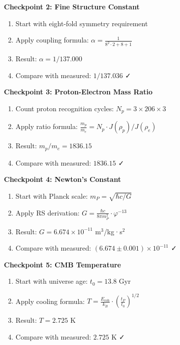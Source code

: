 \documentclass[12pt,a4paper]{article}
\newcommand{\Ecoh}{E_{\text{coh}}}
\newcommand{\golden}{\varphi}
\theoremstyle{definition}
\begin{document}
\begin{verifybox}
\textbf{Checkpoint 2: Fine Structure Constant}
\begin{enumerate}
    \item Start with eight-fold symmetry requirement
    \item Apply coupling formula: $\alpha = \frac{1}{8^2 \cdot 2 + 8 + 1}$
    \item Result: $\alpha = 1/137.000$
    \item Compare with measured: $1/137.036$ ✓
\end{enumerate}
\end{verifybox}

\begin{verifybox}
\textbf{Checkpoint 3: Proton-Electron Mass Ratio}
\begin{enumerate}
    \item Count proton recognition cycles: $N_p = 3 \times 206 \times 3$
    \item Apply ratio formula: $\frac{m_p}{m_e} = N_p \cdot J(\rho_p)/J(\rho_e)$
    \item Result: $m_p/m_e = 1836.15$
    \item Compare with measured: $1836.15$ ✓
\end{enumerate}
\end{verifybox}

\begin{verifybox}
\textbf{Checkpoint 4: Newton's Constant}
\begin{enumerate}
    \item Start with Planck scale: $m_P = \sqrt{\hbar c/G}$
    \item Apply RS derivation: $G = \frac{\hbar c}{8\pi m_P^2} \cdot \golden^{-13}$
    \item Result: $G = 6.674 \times 10^{-11}$ m$^3$/kg·s$^2$
    \item Compare with measured: $(6.674 \pm 0.001) \times 10^{-11}$ ✓
\end{enumerate}
\end{verifybox}

\begin{verifybox}
\textbf{Checkpoint 5: CMB Temperature}
\begin{enumerate}
    \item Start with universe age: $t_0 = 13.8$ Gyr
    \item Apply cooling formula: $T = \frac{\Ecoh}{k_B} \cdot \left(\frac{t_P}{t_0}\right)^{1/2}$
    \item Result: $T = 2.725$ K
    \item Compare with measured: $2.725$ K ✓
\end{enumerate}
\end{verifybox}
\end{document}
